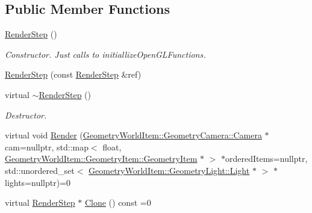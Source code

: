 \subsection*{Public Member Functions}
\begin{DoxyCompactItemize}
\item 
\mbox{\label{class_geometry_engine_1_1_geometry_render_step_1_1_render_step_a29106dd29348ba75cee5cbe8b9679b78}} 
\mbox{\hyperlink{class_geometry_engine_1_1_geometry_render_step_1_1_render_step_a29106dd29348ba75cee5cbe8b9679b78}{Render\+Step}} ()
\begin{DoxyCompactList}\small\item\em Constructor. Just calls to initiallize\+Open\+G\+L\+Functions. \end{DoxyCompactList}\item 
\mbox{\hyperlink{class_geometry_engine_1_1_geometry_render_step_1_1_render_step_a0a1c36303ca0342f1bf9afcecb35e513}{Render\+Step}} (const \mbox{\hyperlink{class_geometry_engine_1_1_geometry_render_step_1_1_render_step}{Render\+Step}} \&ref)
\item 
\mbox{\label{class_geometry_engine_1_1_geometry_render_step_1_1_render_step_a3dcb308f27e22b11e3145d61d24676b3}} 
virtual \mbox{\hyperlink{class_geometry_engine_1_1_geometry_render_step_1_1_render_step_a3dcb308f27e22b11e3145d61d24676b3}{$\sim$\+Render\+Step}} ()
\begin{DoxyCompactList}\small\item\em Destructor. \end{DoxyCompactList}\item 
virtual void \mbox{\hyperlink{class_geometry_engine_1_1_geometry_render_step_1_1_render_step_a78676ad0b7b3fdfad5d1869f28426a83}{Render}} (\mbox{\hyperlink{class_geometry_engine_1_1_geometry_world_item_1_1_geometry_camera_1_1_camera}{Geometry\+World\+Item\+::\+Geometry\+Camera\+::\+Camera}} $\ast$cam=nullptr, std\+::map$<$ float, \mbox{\hyperlink{class_geometry_engine_1_1_geometry_world_item_1_1_geometry_item_1_1_geometry_item}{Geometry\+World\+Item\+::\+Geometry\+Item\+::\+Geometry\+Item}} $\ast$ $>$ $\ast$ordered\+Items=nullptr, std\+::unordered\+\_\+set$<$ \mbox{\hyperlink{class_geometry_engine_1_1_geometry_world_item_1_1_geometry_light_1_1_light}{Geometry\+World\+Item\+::\+Geometry\+Light\+::\+Light}} $\ast$ $>$ $\ast$lights=nullptr)=0
\item 
virtual \mbox{\hyperlink{class_geometry_engine_1_1_geometry_render_step_1_1_render_step}{Render\+Step}} $\ast$ \mbox{\hyperlink{class_geometry_engine_1_1_geometry_render_step_1_1_render_step_afe33ea9d82c5be11f55af7d39691d44b}{Clone}} () const =0
\end{DoxyCompactItemize}
